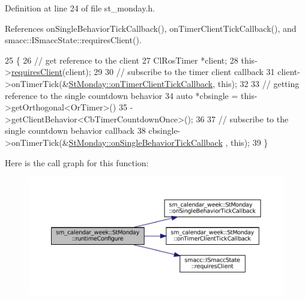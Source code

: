 Definition at line 24 of file st\+\_\+monday.\+h.



References on\+Single\+Behavior\+Tick\+Callback(), on\+Timer\+Client\+Tick\+Callback(), and smacc\+::\+I\+Smacc\+State\+::requires\+Client().


\begin{DoxyCode}
25     \{
26         \textcolor{comment}{// get reference to the client}
27         ClRosTimer *client;
28         this->\hyperlink{classsmacc_1_1ISmaccState_a7f95c9f0a6ea2d6f18d1aec0519de4ac}{requiresClient}(client);
29 
30         \textcolor{comment}{// subscribe to the timer client callback}
31         client->onTimerTick(&\hyperlink{structsm__calendar__week_1_1StMonday_a7d1e6fe61b8618791254704a41cc1833}{StMonday::onTimerClientTickCallback}, \textcolor{keyword}{this});
32 
33         \textcolor{comment}{// getting reference to the single countdown behavior}
34         \textcolor{keyword}{auto} *cbsingle = this->getOrthogonal<OrTimer>()
35                              ->getClientBehavior<CbTimerCountdownOnce>();
36 
37         \textcolor{comment}{// subscribe to the single countdown behavior callback}
38         cbsingle->onTimerTick(&\hyperlink{structsm__calendar__week_1_1StMonday_aa87c025ae961c07bbcfc7af25b721f1e}{StMonday::onSingleBehaviorTickCallback}
      , \textcolor{keyword}{this});
39     \}
\end{DoxyCode}
Here is the call graph for this function\+:
\nopagebreak
\begin{figure}[H]
\begin{center}
\leavevmode
\includegraphics[width=350pt]{structsm__calendar__week_1_1StMonday_aed3cf2a8d76902e9f35d66e99de0a1f9_cgraph}
\end{center}
\end{figure}
\mbox{\label{structsm__calendar__week_1_1StMonday_a2fae8eddd6ad1990e31982aa044f34eb}} 
